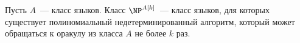 Пусть $A$~--- класс языков. Класс $\NP^{A[k]}$~--- класс языков, для которых существует полиномиальный недетерминированный
алгоритм, который может обращаться к оракулу из класса $A$ не более $k$ раз.
